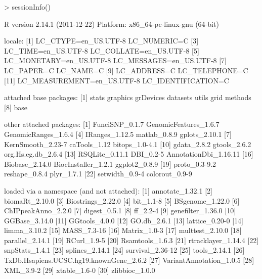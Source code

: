 \documentclass[a4paper]{article}
\begin{document}
\newpage

\begin{Schunk}
\begin{Sinput}
> sessionInfo()
\end{Sinput}
\begin{Soutput}
R version 2.14.1 (2011-12-22)
Platform: x86_64-pc-linux-gnu (64-bit)

locale:
 [1] LC_CTYPE=en_US.UTF-8       LC_NUMERIC=C              
 [3] LC_TIME=en_US.UTF-8        LC_COLLATE=en_US.UTF-8    
 [5] LC_MONETARY=en_US.UTF-8    LC_MESSAGES=en_US.UTF-8   
 [7] LC_PAPER=C                 LC_NAME=C                 
 [9] LC_ADDRESS=C               LC_TELEPHONE=C            
[11] LC_MEASUREMENT=en_US.UTF-8 LC_IDENTIFICATION=C       

attached base packages:
[1] stats     graphics  grDevices datasets  utils     grid      methods  
[8] base     

other attached packages:
 [1] FunciSNP_0.1.7        GenomicFeatures_1.6.7 GenomicRanges_1.6.4  
 [4] IRanges_1.12.5        matlab_0.8.9          gplots_2.10.1        
 [7] KernSmooth_2.23-7     caTools_1.12          bitops_1.0-4.1       
[10] gdata_2.8.2           gtools_2.6.2          org.Hs.eg.db_2.6.4   
[13] RSQLite_0.11.1        DBI_0.2-5             AnnotationDbi_1.16.11
[16] Biobase_2.14.0        BiocInstaller_1.2.1   ggplot2_0.8.9        
[19] proto_0.3-9.2         reshape_0.8.4         plyr_1.7.1           
[22] setwidth_0.9-4        colorout_0.9-9       

loaded via a namespace (and not attached):
 [1] annotate_1.32.1                        
 [2] biomaRt_2.10.0                         
 [3] Biostrings_2.22.0                      
 [4] bit_1.1-8                              
 [5] BSgenome_1.22.0                        
 [6] ChIPpeakAnno_2.2.0                     
 [7] digest_0.5.1                           
 [8] ff_2.2-4                               
 [9] genefilter_1.36.0                      
[10] GGBase_3.14.0                          
[11] GGtools_4.0.0                          
[12] GO.db_2.6.1                            
[13] lattice_0.20-0                         
[14] limma_3.10.2                           
[15] MASS_7.3-16                            
[16] Matrix_1.0-3                           
[17] multtest_2.10.0                        
[18] parallel_2.14.1                        
[19] RCurl_1.9-5                            
[20] Rsamtools_1.6.3                        
[21] rtracklayer_1.14.4                     
[22] snpStats_1.4.1                         
[23] splines_2.14.1                         
[24] survival_2.36-12                       
[25] tools_2.14.1                           
[26] TxDb.Hsapiens.UCSC.hg19.knownGene_2.6.2
[27] VariantAnnotation_1.0.5                
[28] XML_3.9-2                              
[29] xtable_1.6-0                           
[30] zlibbioc_1.0.0                         
\end{Soutput}
\end{Schunk}
\end{document}

